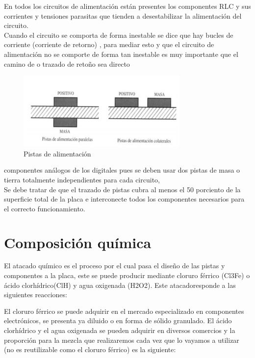 \documentclass[a4paper,12pt,twoside]{proyectotanquesecci}
\begin{document}
En todos los circuitos de alimentación están presentes los componentes RLC  y sus corrientes y tensiones parasitas que tienden a desestabilizar la alimentación del circuito.\\

Cuando el circuito se comporta de forma inestable se dice que hay bucles de corriente (corriente de retorno) , para mediar esto y que el circuito de alimentación no se comporte de forma tan inestable es muy importante que el camino de  o trazado de retoño sea directo\\

\begin{figure}[h]
  \centering
  \includegraphics[scale=1.3]{D_PISTAS2.jpg}
  \renewcommand{\figurename}{Fig.}
  \caption{Pistas de alimentación}
  \label{Pistas de alimentación }
\end{figure}

componentes análogos de los digitales pues se deben usar dos pistas de  masa o tierra  totalmente independientes para cada circuito,\\
  
Se debe tratar de que el trazado de  pistas cubra al menos el 50 porciento de  la superficie total de la placa e interconecte todos los componentes necesarios para el correcto funcionamiento.\\

\section{Composición  química}
El atacado químico es el proceso por el cual  pasa el diseño de las pistas  y componentes  a la placa, este se puede producir mediante cloruro férrico (Cl3Fe) o ácido clorhídrico(ClH) y agua oxigenada (H2O2). Este atacadoresponde a las siguientes reacciones:
   
El cloruro férrico se puede adquirir en el mercado especializado en componentes electrónicos, se presenta ya diluido o en forma de sólido granulado.
El ácido clorhídrico y el agua oxigenada se pueden adquirir en diversos comercios y la proporción para la mezcla que realizaremos cada vez que lo vayamos a utilizar (no es reutilizable como el cloruro férrico) es la siguiente:



















\end{document}
